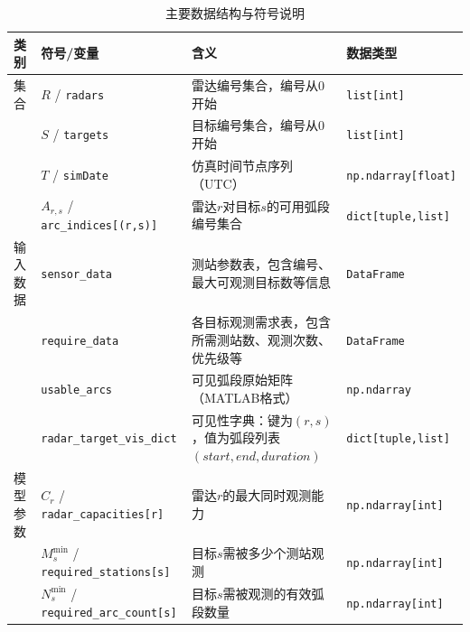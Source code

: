\documentclass[openany,12pt,UTF8]{ctexart}
\begin{document}
\begin{table}
    \centering
    \caption{主要数据结构与符号说明}
    \label{table:主要数据结构与符号说明}
    \begin{tabularx}{\columnwidth}{llXl}
        \toprule
        类别   & 符号/变量                                                  & 含义                                             & 数据类型                       \\
        \midrule
        集合   & $R$ / \texttt{radars}                                  & 雷达编号集合，编号从0开始                                  & \texttt{list[int]}         \\
             & $S$ / \texttt{targets}                                 & 目标编号集合，编号从0开始                                  & \texttt{list[int]}         \\
             & $T$ / \texttt{simDate}                                 & 仿真时间节点序列（UTC）                                  & \texttt{np.ndarray[float]} \\
             & $A_{r,s}$ / \texttt{arc\_indices[(r,s)]}               & 雷达$r$对目标$s$的可用弧段编号集合                           & \texttt{dict[tuple,list]}  \\
        输入数据 & \texttt{sensor\_data}                                  & 测站参数表，包含编号、最大可观测目标数等信息                         & \texttt{DataFrame}         \\
             & \texttt{require\_data}                                 & 各目标观测需求表，包含所需测站数、观测次数、优先级等                     & \texttt{DataFrame}         \\
             & \texttt{usable\_arcs}                                  & 可见弧段原始矩阵（MATLAB格式）                             & \texttt{np.ndarray}        \\
             & \texttt{radar\_target\_vis\_dict}                      & 可见性字典：键为$(r,s)$，值为弧段列表$(start, end, duration)$ & \texttt{dict[tuple,list]}  \\
        模型参数 & $C_r$ / \texttt{radar\_capacities[r]}                  & 雷达$r$的最大同时观测能力                                 & \texttt{np.ndarray[int]}   \\
             & $M_s^{\min}$ / \texttt{required\_stations[s]}          & 目标$s$需被多少个测站观测                                 & \texttt{np.ndarray[int]}   \\
             & $N_s^{\min}$ / \texttt{required\_arc\_count[s]}        & 目标$s$需被观测的有效弧段数量                               & \texttt{np.ndarray[int]}   \\

\end{tabularx}
\end{table}
\end{document}
